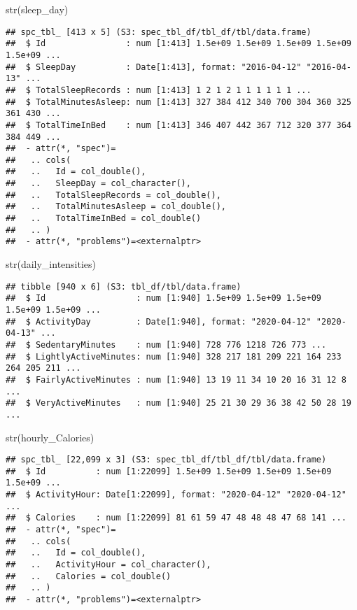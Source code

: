 \documentclass[
]{article}
\newenvironment{Shaded}{\begin{snugshade}}{\end{snugshade}}
\newcommand{\FunctionTok}[1]{\textcolor[rgb]{0.00,0.00,0.00}{#1}}
\newcommand{\NormalTok}[1]{#1}
\begin{document}
\begin{Shaded}
\begin{Highlighting}[]
\FunctionTok{str}\NormalTok{(sleep\_day)}
\end{Highlighting}
\end{Shaded}

\begin{verbatim}
## spc_tbl_ [413 x 5] (S3: spec_tbl_df/tbl_df/tbl/data.frame)
##  $ Id                : num [1:413] 1.5e+09 1.5e+09 1.5e+09 1.5e+09 1.5e+09 ...
##  $ SleepDay          : Date[1:413], format: "2016-04-12" "2016-04-13" ...
##  $ TotalSleepRecords : num [1:413] 1 2 1 2 1 1 1 1 1 1 ...
##  $ TotalMinutesAsleep: num [1:413] 327 384 412 340 700 304 360 325 361 430 ...
##  $ TotalTimeInBed    : num [1:413] 346 407 442 367 712 320 377 364 384 449 ...
##  - attr(*, "spec")=
##   .. cols(
##   ..   Id = col_double(),
##   ..   SleepDay = col_character(),
##   ..   TotalSleepRecords = col_double(),
##   ..   TotalMinutesAsleep = col_double(),
##   ..   TotalTimeInBed = col_double()
##   .. )
##  - attr(*, "problems")=<externalptr>
\end{verbatim}

\begin{Shaded}
\begin{Highlighting}[]
\FunctionTok{str}\NormalTok{(daily\_intensities)}
\end{Highlighting}
\end{Shaded}

\begin{verbatim}
## tibble [940 x 6] (S3: tbl_df/tbl/data.frame)
##  $ Id                  : num [1:940] 1.5e+09 1.5e+09 1.5e+09 1.5e+09 1.5e+09 ...
##  $ ActivityDay         : Date[1:940], format: "2020-04-12" "2020-04-13" ...
##  $ SedentaryMinutes    : num [1:940] 728 776 1218 726 773 ...
##  $ LightlyActiveMinutes: num [1:940] 328 217 181 209 221 164 233 264 205 211 ...
##  $ FairlyActiveMinutes : num [1:940] 13 19 11 34 10 20 16 31 12 8 ...
##  $ VeryActiveMinutes   : num [1:940] 25 21 30 29 36 38 42 50 28 19 ...
\end{verbatim}

\begin{Shaded}
\begin{Highlighting}[]
\FunctionTok{str}\NormalTok{(hourly\_Calories)}
\end{Highlighting}
\end{Shaded}

\begin{verbatim}
## spc_tbl_ [22,099 x 3] (S3: spec_tbl_df/tbl_df/tbl/data.frame)
##  $ Id          : num [1:22099] 1.5e+09 1.5e+09 1.5e+09 1.5e+09 1.5e+09 ...
##  $ ActivityHour: Date[1:22099], format: "2020-04-12" "2020-04-12" ...
##  $ Calories    : num [1:22099] 81 61 59 47 48 48 48 47 68 141 ...
##  - attr(*, "spec")=
##   .. cols(
##   ..   Id = col_double(),
##   ..   ActivityHour = col_character(),
##   ..   Calories = col_double()
##   .. )
##  - attr(*, "problems")=<externalptr>
\end{verbatim}
\end{document}
